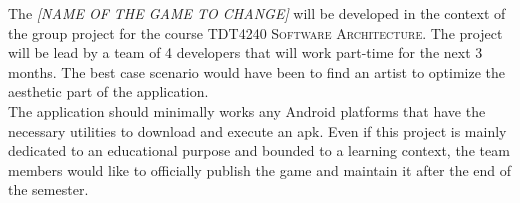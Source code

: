 The \textit{[NAME OF THE GAME TO CHANGE]} will be developed in the context of the group project for the course \textsc{TDT4240 Software Architecture}. The project will be lead by a team of 4 developers that will work part-time for the next 3 months. The best case scenario would have been to find an artist to optimize the aesthetic part of the application. \\

The application should minimally works any Android platforms that have the necessary utilities to download and execute an \gls{apk}. Even if this project is mainly dedicated to an educational purpose and bounded to a learning context, the team members would like to officially publish the game and maintain it after the end of the semester.
